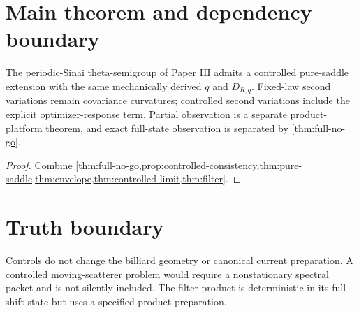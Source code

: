 
\section{Main theorem and dependency boundary}\label{sec:main}
\begin{theorem}\label{thm:main}
The periodic-Sinai theta-semigroup of Paper III admits a controlled pure-saddle
extension with the same mechanically derived $q$ and $D_{R,q}$.  Fixed-law
second variations remain covariance curvatures; controlled second variations
include the explicit optimizer-response term.  Partial observation is a
separate product-platform theorem, and exact full-state observation is
separated by \cref{thm:full-no-go}.
\end{theorem}
\begin{proof}
Combine \cref{thm:full-no-go,prop:controlled-consistency,thm:pure-saddle,thm:envelope,thm:controlled-limit,thm:filter}.
\end{proof}

\section*{Truth boundary}
Controls do not change the billiard geometry or canonical current preparation.
A controlled moving-scatterer problem would require a nonstationary spectral
packet and is not silently included.  The filter product is deterministic in
its full shift state but uses a specified product preparation.
\printbibliography
